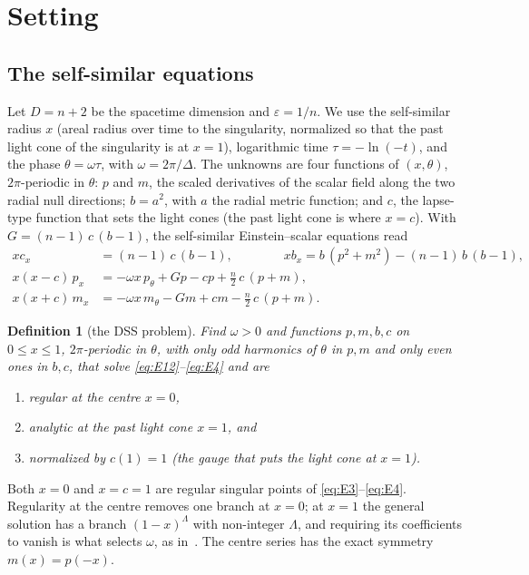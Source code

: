 \documentclass{amsart}
\numberwithin{equation}{section}
\theoremstyle{plain}
\newtheorem{definition}{Definition}[section]
\theoremstyle{definition}
\theoremstyle{remark}
\newcommand{\eps}{\varepsilon}
\begin{document}
\section{Setting}
\label{sec:setting}

\subsection{The self-similar equations}
Let $D = n + 2$ be the spacetime dimension and $\eps = 1/n$. We use the self-similar radius $x$ (areal radius over time
to the singularity, normalized so that the past light cone of the singularity is at $x = 1$), logarithmic time
$\tau = -\ln(-t)$, and the phase $\theta = \omega\tau$, with $\omega = 2\pi/\Delta$. The unknowns are four functions of
$(x, \theta)$, $2\pi$-periodic in $\theta$: $p$ and $m$, the scaled derivatives of the scalar field along the two radial
null directions; $b = a^2$, with $a$ the radial metric function; and $c$, the lapse-type function that sets the light
cones (the past light cone is where $x = c$). With $G = (n-1)\,c\,(b-1)$, the self-similar Einstein--scalar equations
read~\cite{companion}
\begin{align}
x c_x &= (n-1)\,c\,(b-1), \qquad\qquad x b_x = b\,(p^2+m^2) - (n-1)\,b\,(b-1), \label{eq:E12}\\
x(x-c)\,p_x &= -\omega x\,p_\theta + G p - c p + \tfrac{n}{2}\,c\,(p+m), \label{eq:E3}\\
x(x+c)\,m_x &= -\omega x\,m_\theta - G m + c m - \tfrac{n}{2}\,c\,(p+m). \label{eq:E4}
\end{align}

\begin{definition}[the DSS problem]\label{def:dss}
Find $\omega > 0$ and functions $p, m, b, c$ on $0 \le x \le 1$, $2\pi$-periodic in $\theta$, with only odd harmonics of
$\theta$ in $p, m$ and only even ones in $b, c$, that solve \eqref{eq:E12}--\eqref{eq:E4} and are
\begin{enumerate}[label=(\roman*)]
\item regular at the centre $x = 0$,
\item analytic at the past light cone $x = 1$, and
\item normalized by $c(1) = 1$ (the gauge that puts the light cone at $x = 1$).
\end{enumerate}
\end{definition}

Both $x = 0$ and $x = c = 1$ are regular singular points of \eqref{eq:E3}--\eqref{eq:E4}. Regularity at the centre
removes one branch at $x = 0$; at $x = 1$ the general solution has a branch $(1-x)^{\Lambda}$ with non-integer $\Lambda$,
and requiring its coefficients to vanish is what selects $\omega$, as in~\cite{Gundlach1995}. The centre series has the
exact symmetry $m(x) = p(-x)$.
\end{document}

